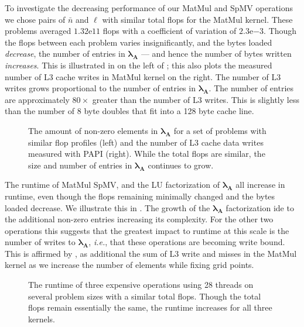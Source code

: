 %
%
%
To investigate the decreasing performance of our MatMul and SpMV operations we chose pairs of $\bar{n}$ and $\ell$ with similar total flops for the MatMul kernel.
These problems averaged $1.32\mathrm{e}11$ flops with a coefficient of variation of $2.3\mathrm{e}{-3}$.
Though the flops between each problem varies insignificantly, and the bytes loa\-ded \emph{decrease}, the number of entries in $\symbf{\lambda_{\textbf{A}}}$ --- and hence the number of bytes written \emph{increases}. 
This is illustrated in on the left of ; this also plots the measured number of L3 cache writes in MatMul kernel on the right. 
The number of L3 writes grows proportional to the number of entries in $\symbf{\lambda_{\textbf{A}}}$.
The number of entries are approximately $80\times$ greater than the number of L3 writes. This is slightly less than the number of 8 byte doubles that fit into a 128 byte cache line.

%
%
%
\begin{figure}[!h]
	
	\caption{
	    The amount of non-zero elements in $\symbf{\lambda_{\textbf{A}}}$ for a set of problems with similar flop profiles (left) and the number of L3 cache data writes measured with PAPI (right). 
	    While the total flops are similar, the size and number of entries in $\symbf{\lambda_{\textbf{A}}}$ continues to grow. 
	    }
    \label{fig:mem_exp_b}
\end{figure}

\noindent
The runtime of MatMul SpMV, and the LU factorization of $\symbf{\lambda}_{\textbf{A}}$ all increase in runtime, even though the flops remaining minimally changed and the bytes loaded decrease. 
We illustrate this in . 
The growth of the $\symbf{\lambda}_{\textbf{A}}$ factorization ide to the additional non-zero entries increasing its complexity.
For the other two operations this suggests that the greatest impact to runtime at this scale is the number of writes to $\symbf{\lambda}_{\textbf{A}}$, \emph{i.e.}, that these operations are becoming write bound.
This is affirmed by , as additional the sum of L3 write and misses in the MatMul kernel as we increase the number of elements while fixing grid points.  


\begin{figure}[h]
	
	\caption{
	    The runtime of three expensive operations using 28 threads on several problem sizes with a similar total flops. 
	    Though the total flops remain essentially the same, the runtime increases for all three kernels.
	    }
	\label{fig:mem_exp_a}
\end{figure}



